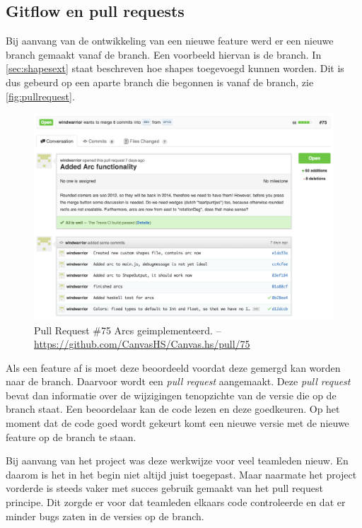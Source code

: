 \subsection{Gitflow en pull requests}

Bij aanvang van de ontwikkeling van een nieuwe feature werd er een nieuwe branch gemaakt vanaf de  branch. Een voorbeeld hiervan is de  branch. In \autoref{sec:shapesext} staat beschreven hoe  shapes toegevoegd kunnen worden. Dit is dus gebeurd op een aparte branch die begonnen is vanaf de  branch, zie \autoref{fig:pullrequest}. 

\begin{figure}
\begin{center}
\includegraphics[keepaspectratio,width=\textwidth]{./images/pullrequest.png}
\caption{Pull Request \#75 Arcs geimplementeerd. – \url{https://github.com/CanvasHS/Canvas.hs/pull/75}}
\label{fig:pullrequest}
\end{center}
\end{figure}

Als een feature af is moet deze beoordeeld voordat deze gemergd kan worden naar de  branch. Daarvoor wordt een \emph{pull request} aangemaakt. Deze \emph{pull request} bevat dan informatie over de wijzigingen tenopzichte van de versie die op de  branch staat. Een beoordelaar kan de code lezen en deze goedkeuren. Op het moment dat de code goed wordt gekeurt komt een nieuwe versie met de nieuwe feature op de  branch te staan.

Bij aanvang van het project was deze werkwijze voor veel teamleden nieuw. En daarom is het in het begin niet altijd juist toegepast. Maar naarmate het project vorderde is steeds vaker met succes gebruik gemaakt van het pull request principe. Dit zorgde er voor dat teamleden elkaars code controleerde en dat er minder bugs zaten in de versies op de  branch.

